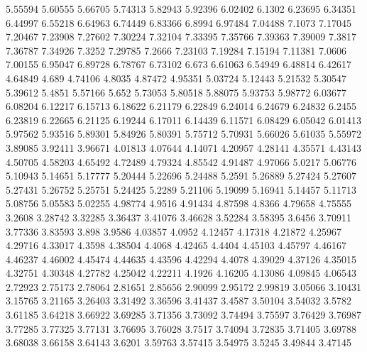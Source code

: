 5.55594      5.60555      5.66705      5.74313      5.82943      5.92396      6.02402      6.1302      6.23695      6.34351      6.44997      6.55218      6.64963      6.74449      6.83366      6.8994      6.97484      7.04488      7.1073      7.17045      7.20467      7.23908      7.27602      7.30224      7.32104      7.33395      7.35766      7.39363      7.39009      7.3817      7.36787      7.34926      7.3252      7.29785      7.2666      7.23103      7.19284      7.15194      7.11381      7.0606      7.00155      6.95047      6.89728      6.78767      6.73102      6.673      6.61063      6.54949      6.48814      6.42617      
4.64849      4.689      4.74106      4.8035      4.87472      4.95351      5.03724      5.12443      5.21532      5.30547      5.39612      5.4851      5.57166      5.652      5.73053      5.80518      5.88075      5.93753      5.98772      6.03677      6.08204      6.12217      6.15713      6.18622      6.21179      6.22849      6.24014      6.24679      6.24832      6.2455      6.23819      6.22665      6.21125      6.19244      6.17011      6.14439      6.11571      6.08429      6.05042      6.01413      5.97562      5.93516      5.89301      5.84926      5.80391      5.75712      5.70931      5.66026      5.61035      5.55972      
3.89085      3.92411      3.96671      4.01813      4.07644      4.14071      4.20957      4.28141      4.35571      4.43143      4.50705      4.58203      4.65492      4.72489      4.79324      4.85542      4.91487      4.97066      5.0217      5.06776      5.10943      5.14651      5.17777      5.20444      5.22696      5.24488      5.2591      5.26889      5.27424      5.27607      5.27431      5.26752      5.25751      5.24425      5.2289      5.21106      5.19099      5.16941      5.14457      5.11713      5.08756      5.05583      5.02255      4.98774      4.9516      4.91434      4.87598      4.8366      4.79658      4.75555      
3.2608      3.28742      3.32285      3.36437      3.41076      3.46628      3.52284      3.58395      3.6456      3.70911      3.77336      3.83593      3.898      3.9586      4.03857      4.0952      4.12457      4.17318      4.21872      4.25967      4.29716      4.33017      4.3598      4.38504      4.4068      4.42465      4.4404      4.45103      4.45797      4.46167      4.46237      4.46002      4.45474      4.44635      4.43596      4.42294      4.4078      4.39029      4.37126      4.35015      4.32751      4.30348      4.27782      4.25042      4.22211      4.1926      4.16205      4.13086      4.09845      4.06543      
2.72923      2.75173      2.78064      2.81651      2.85656      2.90099      2.95172      2.99819      3.05066      3.10431      3.15765      3.21165      3.26403      3.31492      3.36596      3.41437      3.4587      3.50104      3.54032      3.5782      3.61185      3.64218      3.66922      3.69285      3.71356      3.73092      3.74494      3.75597      3.76429      3.76987      3.77285      3.77325      3.77131      3.76695      3.76028      3.7517      3.74094      3.72835      3.71405      3.69788      3.68038      3.66158      3.64143      3.6201      3.59763      3.57415      3.54975      3.5245      3.49844      3.47145      
